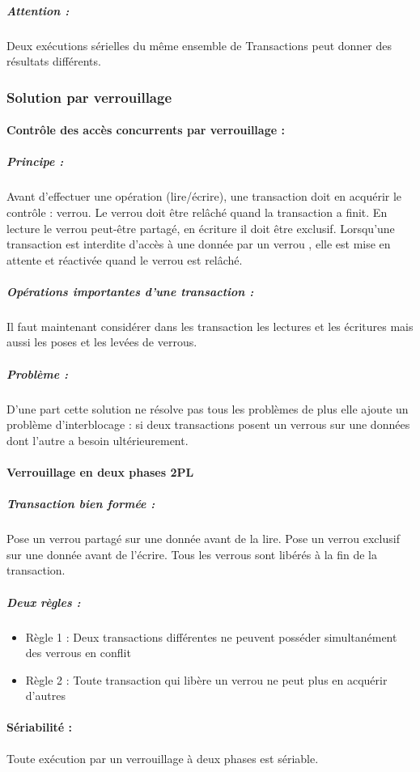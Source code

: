 \documentclass[10pt,a4paper,twoside]{article}
\begin{document}
\subparagraph{Attention :} Deux exécutions sérielles du même ensemble de Transactions peut donner des résultats différents.

\subsubsection{Solution par verrouillage}

\paragraph{Contrôle des accès concurrents par verrouillage :} 
\subparagraph{Principe :} Avant d'effectuer une opération (lire/écrire), une transaction doit en acquérir le contrôle : verrou. Le verrou doit être relâché quand la transaction a finit. En lecture le verrou peut-être partagé, en écriture il doit être exclusif. Lorsqu'une transaction est interdite d'accès à une donnée par un verrou , elle est mise en attente et réactivée quand le verrou est relâché.

\subparagraph{Opérations importantes d'une transaction :} Il faut maintenant considérer dans les transaction les lectures et les écritures mais aussi les poses et les levées de verrous.

\subparagraph{Problème :} D'une part cette solution ne résolve pas tous les problèmes de plus elle ajoute un problème d'interblocage : si deux transactions posent un verrous sur une données dont l'autre a besoin ultérieurement.

\paragraph{Verrouillage en deux phases 2PL}
\subparagraph{Transaction bien formée :} Pose un verrou partagé sur une donnée avant de la lire. Pose un verrou exclusif sur une donnée avant de l'écrire. Tous les verrous sont libérés à la fin de la transaction.

\subparagraph{Deux règles :}
\begin{itemize}
\item Règle 1 : Deux transactions différentes ne peuvent posséder simultanément des verrous en conflit
\item Règle 2 : Toute transaction qui libère un verrou ne peut plus en acquérir d'autres
\end{itemize}

\paragraph{Sériabilité : } Toute exécution par un verrouillage à deux phases est sériable.
\end{document}

